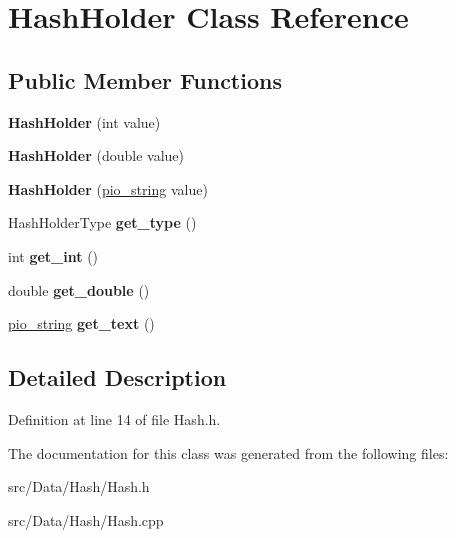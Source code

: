 \hypertarget{class_hash_holder}{
\section{HashHolder Class Reference}
\label{class_hash_holder}
}
\subsection*{Public Member Functions}
\begin{DoxyCompactItemize}
\item 
\hypertarget{class_hash_holder_a73a7fc7da4264ae5de80bc3bf48f49d3}{
{\bfseries HashHolder} (int value)}
\label{class_hash_holder_a73a7fc7da4264ae5de80bc3bf48f49d3}

\item 
\hypertarget{class_hash_holder_a2b3de85af14140a345aef804cabfc28d}{
{\bfseries HashHolder} (double value)}
\label{class_hash_holder_a2b3de85af14140a345aef804cabfc28d}

\item 
\hypertarget{class_hash_holder_a65261e242b8762d934f6af58249ef0b0}{
{\bfseries HashHolder} (\hyperlink{classpio__string}{pio\_\-string} value)}
\label{class_hash_holder_a65261e242b8762d934f6af58249ef0b0}

\item 
\hypertarget{class_hash_holder_ada2186dc1df2c84bbdbd1f83dacb0b4f}{
HashHolderType {\bfseries get\_\-type} ()}
\label{class_hash_holder_ada2186dc1df2c84bbdbd1f83dacb0b4f}

\item 
\hypertarget{class_hash_holder_a578e3f3b2e2ce14a6d3f818d0d5b39de}{
int {\bfseries get\_\-int} ()}
\label{class_hash_holder_a578e3f3b2e2ce14a6d3f818d0d5b39de}

\item 
\hypertarget{class_hash_holder_aed0538cc9b91f480c73d1139c954f055}{
double {\bfseries get\_\-double} ()}
\label{class_hash_holder_aed0538cc9b91f480c73d1139c954f055}

\item 
\hypertarget{class_hash_holder_a2d54658cdace31b2d1a5800f5b852bbf}{
\hyperlink{classpio__string}{pio\_\-string} {\bfseries get\_\-text} ()}
\label{class_hash_holder_a2d54658cdace31b2d1a5800f5b852bbf}

\end{DoxyCompactItemize}


\subsection{Detailed Description}


Definition at line 14 of file Hash.h.



The documentation for this class was generated from the following files:\begin{DoxyCompactItemize}
\item 
src/Data/Hash/Hash.h\item 
src/Data/Hash/Hash.cpp\end{DoxyCompactItemize}
